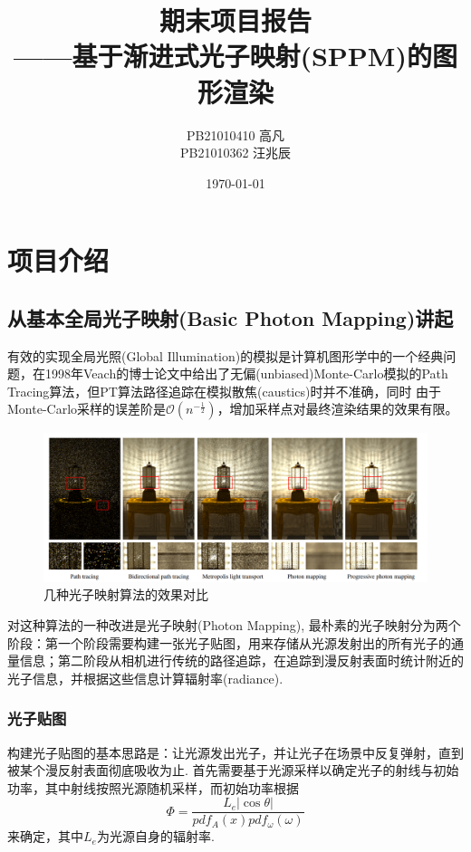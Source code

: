 \documentclass[12pt]{article}
\title{期末项目报告\\ \large ——基于渐进式光子映射(SPPM)的图形渲染}
\author{PB21010410 高凡 \\PB21010362 汪兆辰}
\date{\today}
\begin{document}
\maketitle

\section{项目介绍}
\subsection{从基本全局光子映射(Basic Photon Mapping)讲起}
有效的实现全局光照(Global Illumination)的模拟是计算机图形学中的一个经典问题，在1998年Veach的博士论文中给出了无偏(unbiased)Monte-Carlo模拟的Path Tracing算法，但PT算法路径追踪在模拟散焦(caustics)时并不准确，同时
由于Monte-Carlo采样的误差阶是$\mathcal{O} (n^{-\frac{1}{2}})$，增加采样点对最终渲染结果的效果有限。

\begin{figure}[htbp]
    \centering
    \includegraphics[scale=0.6]{pic1.png}
    \caption{几种光子映射算法的效果对比}
\end{figure}

对这种算法的一种改进是光子映射(Photon Mapping), 最朴素的光子映射分为两个阶段：第一个阶段需要构建一张光子贴图，用来存储从光源发射出的所有光子的通量信息；第二阶段从相机进行传统的路径追踪，在追踪到漫反射表面时统计附近的光子信息，并根据这些信息计算辐射率(radiance). 

\subsubsection{光子贴图}

构建光子贴图的基本思路是：让光源发出光子，并让光子在场景中反复弹射，直到被某个漫反射表面彻底吸收为止. 首先需要基于光源采样以确定光子的射线与初始功率，其中射线按照光源随机采样，而初始功率根据
\begin{equation}
    \Phi = \frac{L_e |\cos \theta|}{pdf_A (x)pdf_\omega (\omega)}
\end{equation}
来确定，其中$L_e$为光源自身的辐射率. 
\end{document}

